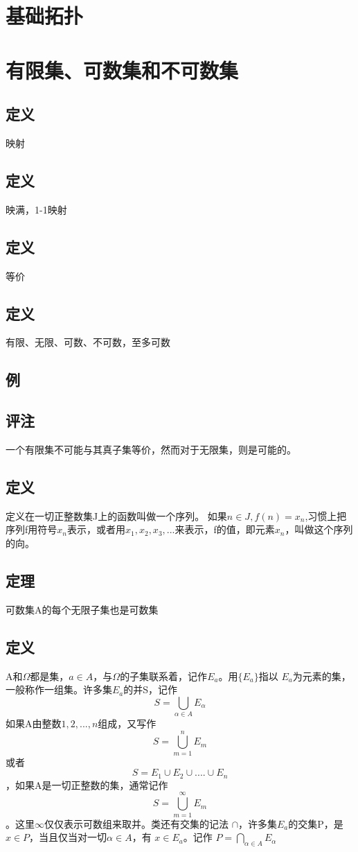\chapter{基础拓扑}
\chapter*{有限集、可数集和不可数集}
\section{定义}映射
\section{定义}映满，1-1映射
\section{定义}等价
\section{定义}有限、无限、可数、不可数，至多可数
\section{例}
\section{评注} 一个有限集不可能与其真子集等价，然而对于无限集，则是可能的。
\section{定义} 定义在一切正整数集J上的函数叫做一个序列。
如果$ n \in J, f(n)= x_n $,习惯上把序列f用符号${x_n}$表示，或者用$x_1, x_2, x_3, ...$来表示，f的值，即元素$x_n$，叫做这个序列的向。
\section{定理}可数集A的每个无限子集也是可数集
\section{定义}A和$\Omega$都是集，$ a \in A $，与$\Omega$的子集联系着，记作$E_a$。用$\{E_a\}$指以
$E_a$为元素的集，一般称作一组集。许多集$E_a$的并S，记作$$ S = \bigcup_{\alpha \in A }E_{\alpha} $$
如果A由整数$1,2,...,n$组成，又写作$$ S=\bigcup_{m=1}^nE_m $$ 或者 $$ S = E_1 \cup E_2 \cup .... \cup E_n $$ ，如果A是一切正整数的集，通常记作 $$ S = \bigcup_{m=1}^{\infty}E_m $$。这里$\infty$仅仅表示可数组来取并。类还有交集的记法 $\cap$，许多集$E_a$的交集P，是$ x \in P $，当且仅当对一切$ \alpha \in A $，有 $ x \in E_a $。记作 $ P = \bigcap_{\alpha \in A}E_{\alpha}$
